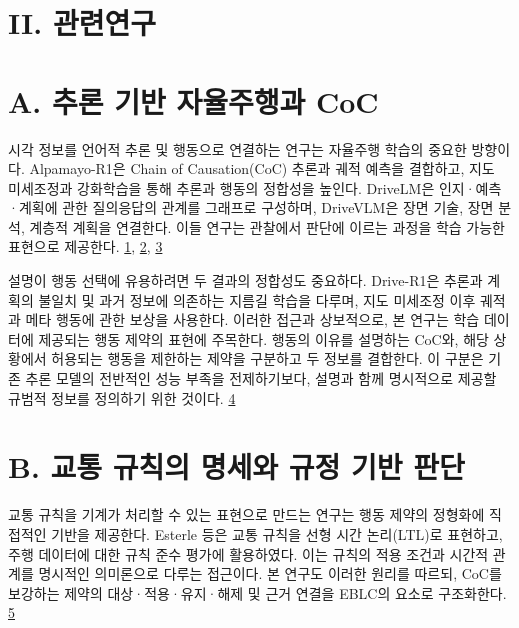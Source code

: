 \documentclass[11pt,a4paper]{article}
\begin{document}
\section*{II. 관련연구}


\section*{A. 추론 기반 자율주행과 CoC}

시각 정보를 언어적 추론 및 행동으로 연결하는 연구는 자율주행 학습의 중요한 방향이다. Alpamayo-R1은 Chain of Causation(CoC) 추론과 궤적 예측을 결합하고, 지도 미세조정과 강화학습을 통해 추론과 행동의 정합성을 높인다. DriveLM은 인지·예측·계획에 관한 질의응답의 관계를 그래프로 구성하며, DriveVLM은 장면 기술, 장면 분석, 계층적 계획을 연결한다. 이들 연구는 관찰에서 판단에 이르는 과정을 학습 가능한 표현으로 제공한다. \href{\detokenize{https://arxiv.org/abs/2511.00088}}{1}, \href{\detokenize{https://arxiv.org/abs/2312.14150}}{2}, \href{\detokenize{https://arxiv.org/abs/2402.12289}}{3}\par

설명이 행동 선택에 유용하려면 두 결과의 정합성도 중요하다. Drive-R1은 추론과 계획의 불일치 및 과거 정보에 의존하는 지름길 학습을 다루며, 지도 미세조정 이후 궤적과 메타 행동에 관한 보상을 사용한다. 이러한 접근과 상보적으로, 본 연구는 학습 데이터에 제공되는 행동 제약의 표현에 주목한다. 행동의 이유를 설명하는 CoC와, 해당 상황에서 허용되는 행동을 제한하는 제약을 구분하고 두 정보를 결합한다. 이 구분은 기존 추론 모델의 전반적인 성능 부족을 전제하기보다, 설명과 함께 명시적으로 제공할 규범적 정보를 정의하기 위한 것이다. \href{\detokenize{https://ojs.aaai.org/index.php/AAAI/article/view/37602}}{4}\par

\section*{B. 교통 규칙의 명세와 규정 기반 판단}

교통 규칙을 기계가 처리할 수 있는 표현으로 만드는 연구는 행동 제약의 정형화에 직접적인 기반을 제공한다. Esterle 등은 교통 규칙을 선형 시간 논리(LTL)로 표현하고, 주행 데이터에 대한 규칙 준수 평가에 활용하였다. 이는 규칙의 적용 조건과 시간적 관계를 명시적인 의미론으로 다루는 접근이다. 본 연구도 이러한 원리를 따르되, CoC를 보강하는 제약의 대상·적용·유지·해제 및 근거 연결을 EBLC의 요소로 구조화한다. \href{\detokenize{https://arxiv.org/abs/2007.00330}}{5}\par
\end{document}
